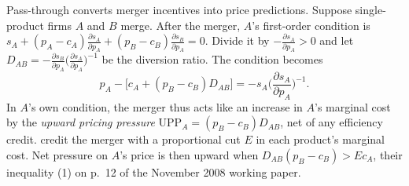 \begin{remark}\label{rem:B-upp}
Pass-through converts merger incentives into price predictions. Suppose single-product firms $A$ and $B$ merge.
After the merger, $A$'s first-order condition is
$s_A + (p_A - c_A)\frac{\partial s_A}{\partial p_A} + (p_B - c_B)\frac{\partial s_B}{\partial p_A} = 0$. Divide it by
$-\frac{\partial s_A}{\partial p_A} > 0$ and let $D_{AB} = -\frac{\partial s_B}{\partial p_A}\big(\frac{\partial s_A}{\partial p_A}\big)^{-1}$ be the
diversion ratio. The condition becomes
\begin{equation*}
p_A - \big[c_A + (p_B - c_B)D_{AB}\big] = -s_A\Big(\frac{\partial s_A}{\partial p_A}\Big)^{-1} .
\end{equation*}
In $A$'s own condition, the merger thus acts like an increase in $A$'s marginal cost by the \emph{upward pricing
pressure} $\mathrm{UPP}_A = (p_B - c_B)D_{AB}$, net of any efficiency credit. \citet{FarrellShapiro2010} credit the merger
with a proportional cut $E$ in each product's marginal cost. Net pressure on $A$'s price is then upward when
$D_{AB}(p_B - c_B) > Ec_A$, their inequality (1) on p.~12 of the November 2008 working paper.


\end{remark}
